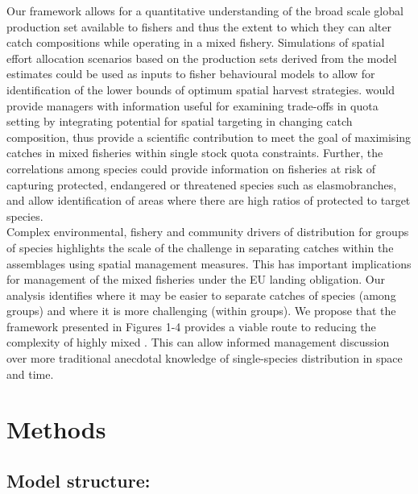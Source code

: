 \documentclass[fleqn,10pt]{wlscirep}
\begin{document}
\begin{linenumbers}
Our framework allows for a quantitative understanding of the broad scale global
production set available to fishers\cite{Reimer2017} and thus the extent to
which they can alter catch compositions while operating in a mixed fishery.
Simulations of spatial effort allocation scenarios based on the production sets
derived from the model estimates could be used as inputs to fisher behavioural
models to allow for identification of the lower bounds of optimum spatial
harvest strategies.  would provide managers with
information useful for examining trade-offs in quota setting by integrating
potential for spatial targeting in changing catch composition, thus provide a
scientific contribution to  meet the goal of maximising catches in mixed fisheries
within single stock quota constraints\cite{Ulrich2016}. Further, the
correlations among species could provide information on fisheries at risk of
capturing protected, endangered or threatened species such as elasmobranches,
and allow identification of areas where there are high ratios of protected to
target species.\\


Complex environmental, fishery and community drivers of distribution for groups
of species highlights the scale of the challenge in separating catches within
the assemblages using spatial management measures. This has important
implications for management of the mixed fisheries under the EU landing
obligation. Our analysis identifies where it may be easier to separate catches
of species (among groups) and where it is more challenging (within groups). We
propose that the  framework presented in Figures 1-4 provides a viable route to
reducing the complexity of highly mixed .  This can allow informed
management discussion over more traditional anecdotal knowledge of
single-species distribution in space and time.\\


\section*{Methods\\}

\subsection*{Model structure:\\} 


\end{linenumbers}
\end{document}
